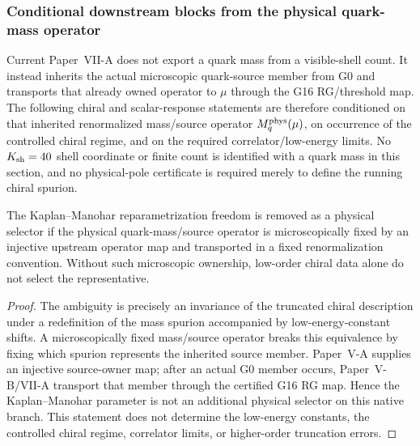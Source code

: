 \documentclass[12pt,a4paper]{article}
\begin{document}
\subsubsection{Conditional downstream blocks from the physical quark-mass operator}
\label{p11:subsec:native-downstream-e40-blocks}

Current Paper~VII-A does not export a quark mass from a visible-shell count.  It instead inherits the actual microscopic quark-source member from G0 and transports that already owned operator to \(\mu\) through the G16 RG/threshold map.  The following chiral and scalar-response statements are therefore conditioned on that inherited renormalized mass/source operator \(M_q^{\rm phys}(\mu)\), on occurrence of the controlled chiral regime, and on the required correlator/low-energy limits.  No \({K_{\mathrm{sh}}}=40\) shell coordinate or finite count is identified with a quark mass in this section, and no physical-pole certificate is required merely to define the running chiral spurion.

\begin{theorem}
\label{p11:thm:kaplan-manohar-ambiguity-absent}

The Kaplan--Manohar reparametrization freedom is removed as a physical selector if the physical quark-mass/source operator is microscopically fixed by an injective upstream operator map and transported in a fixed renormalization convention.  Without such microscopic ownership, low-order chiral data alone do not select the representative.
\label{p11:eq:km-lambda-zero}
\end{theorem}
\begin{proof}

The ambiguity is precisely an invariance of the truncated chiral description under a redefinition of the mass spurion accompanied by low-energy-constant shifts.  A microscopically fixed mass/source operator breaks this equivalence by fixing which spurion represents the inherited source member.  Paper~V-A supplies an injective source-owner map; after an actual G0 member occurs, Paper~V-B/VII-A transport that member through the certified G16 RG map.  Hence the Kaplan--Manohar parameter is not an additional physical selector on this native branch.  This statement does not determine the low-energy constants, the controlled chiral regime, correlator limits, or higher-order truncation errors.
\end{proof}
\end{document}
